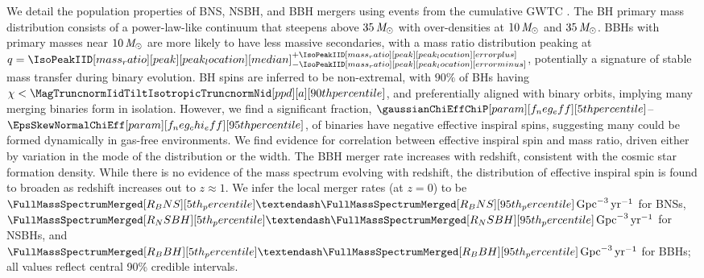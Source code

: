 \noindent We detail the population properties of \acl{BNS}, \acl{NSBH}, and \acl{BBH} mergers using \counts[combined][total] events from the cumulative \acl{GWTC} \thisgwtcversionfull{}.
The \acl{BH} primary mass distribution consists of a power-law-like continuum that steepens above $35\,\mathit{M_\odot}$ with over-densities at $10\,\mathit{M_\odot}$ and $35\,\mathit{M_\odot}$.
\Aclp{BBH} with primary masses near $10\,\mathit{M_\odot}$ are more likely to have less massive secondaries, with a mass ratio distribution peaking at $q = \CIPlusMinus{\IsoPeakIID[mass_ratio][peak][peak_location]}$, potentially a signature of stable mass transfer during binary evolution.
\Acl{BH} spins are inferred to be non-extremal, with $90\%$ of \aclp{BH} having $\chi<\MagTruncnormIidTiltIsotropicTruncnormNid[ppd][a][90th percentile]$, and preferentially aligned with binary orbits, implying many merging binaries form in isolation. However, we find a significant fraction, $\gaussianChiEffChiP[param][f_neg_eff][5th percentile]$--$\EpsSkewNormalChiEff[param][f_neg_chi_eff][95th percentile]$, of binaries have negative effective inspiral spins, suggesting many could be formed dynamically in gas-free environments.
We find evidence for correlation between effective inspiral spin and mass ratio, driven either by variation in the mode of the distribution or the width.
The \acl{BBH} merger rate increases with redshift, consistent with the cosmic star formation density.
While there is no evidence of the mass spectrum evolving with redshift, the distribution of effective inspiral spin is found to broaden as redshift increases out to $z\approx 1$.
We infer the local merger rates (at $z=0$) to be $\FullMassSpectrumMerged[R_BNS][5th_percentile]\textendash\FullMassSpectrumMerged[R_BNS][95th_percentile]\,\perGpcyr$ for \aclp{BNS}, $\FullMassSpectrumMerged[R_NSBH][5th_percentile]\textendash\FullMassSpectrumMerged[R_NSBH][95th_percentile]\,\perGpcyr$ for \aclp{NSBH}, and $\FullMassSpectrumMerged[R_BBH][5th_percentile]\textendash\FullMassSpectrumMerged[R_BBH][95th_percentile]\,\perGpcyr$ for \aclp{BBH}; all values reflect central 90\% credible intervals.
